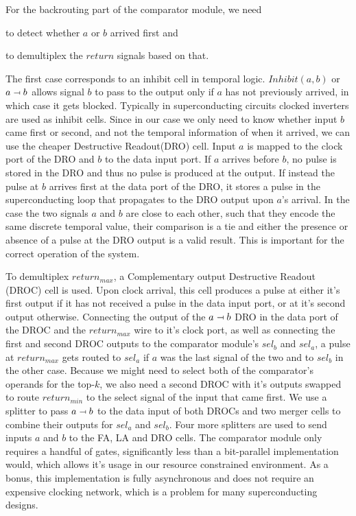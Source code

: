 \documentclass{article}
\newcommand{\inhib}{\relbar\mapsfromchar}
\begin{document}
For the backrouting part of the comparator module, we need
\begin{enumerate*}[label=\emph{\alph*})] \item to detect
    whether $a$ or $b$ arrived first and \item to
      demultiplex the $return$ signals based on that.
\end{enumerate*} The first case corresponds to an inhibit
cell in temporal logic. $Inhibit(a,b)$ or $a \inhib b$
allows signal $b$ to pass to the output only if $a$ has not
previously arrived, in which case it gets blocked. Typically
in superconducting circuits clocked inverters are used as
inhibit cells. Since in our case we only need to know
whether input $b$ came first or second, and not the temporal
information of when it arrived, we can use the cheaper
Destructive Readout(DRO) cell. Input $a$ is mapped to the
clock port of the DRO and $b$ to the data input port. If $a$
arrives before $b$, no pulse is stored in the DRO and thus
no pulse is produced at the output. If instead the pulse at
$b$ arrives first at the data port of the DRO, it stores a
pulse in the superconducting loop that propagates to the DRO
output upon $a$'s arrival. In the case the two signals $a$
and $b$ are close to each other, such that they encode the
same discrete temporal value, their comparison is a tie and
either the presence or absence of a pulse at the DRO output
is a valid result. This is important for the correct
operation of the system.

To demultiplex $return_{max}$, a Complementary output
Destructive Readout (DROC) cell is used. Upon clock arrival,
this cell produces a pulse at either it's first output if it
has not received a pulse in the data input port, or at it's
second output otherwise. Connecting the output of the $a
\inhib b$ DRO in the data port of the DROC and the
$return_{max}$ wire to it's clock port, as well as
connecting the first and second DROC outputs to the
comparator module's $sel_b$ and $sel_a$, a pulse at
$return_{max}$ gets routed to $sel_a$ if $a$ was the last
signal of the two and to $sel_b$ in the other case. Because
we might need to select both of the comparator's operands
for the top-$k$, we also need a second DROC with it's
outputs swapped to route $return_{min}$ to the select signal
of the input that came first. We use a splitter to pass $a
\inhib b$ to the data input of both DROCs and two merger
cells to combine their outputs for $sel_a$ and $sel_b$. Four
more splitters are used to send inputs $a$ and $b$ to the
FA, LA and DRO cells. The comparator module only requires a
handful of gates, significantly less than a bit-parallel
implementation would, which allows it's usage in our
resource constrained environment. As a bonus, this implementation
is fully asynchronous and does not require an expensive clocking network,
which is a problem for many superconducting designs.
\end{document}
